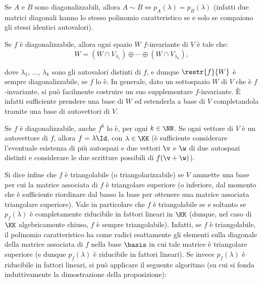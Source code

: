 \documentclass[10pt,landscape]{article}
\begin{document}
\begin{multicols}{3}
		Se $A$ e $B$ sono diagonalizzabili, allora $A \sim B \iff p_A(\lambda) =
		p_B(\lambda)$ (infatti due matrici diagonali hanno lo stesso polinomio
		caratteristico se e solo se compaiono gli stessi identici autovalori).
		
		Se $f$ è diagonalizzabile, allora ogni spazio $W$ $f$-invariante di
		$V$ è tale che:
		\[ W = (W \cap V_{\lambda_1}) \oplus \cdots \oplus (W \cap V_{\lambda_k}), \]
		
		dove $\lambda_1$, ..., $\lambda_k$ sono gli autovalori distinti di
		$f$, e dunque $\restr{f}{W}$ è sempre diagonalizzabile, se $f$ lo è. In generale, dato un sottospazio $W$ di $V$ che
		è $f$-invariante, si può facilmente costruire un suo
		supplementare $f$-invariante. È infatti sufficiente
		prendere una base di $W$ ed estenderla a base di $V$
		completandola tramite una base di autovettori di $V$.
		
		Se $f$ è diagonalizzabile, anche $f^k$ lo è, per ogni $k \in \NN$. Se
		ogni vettore di $V$ è un autovettore di $f$, allora $f = \lambda \Id$,
		con $\lambda \in \KK$ (è sufficiente considerare l'eventuale esistenza di più
		autospazi e due vettori $\v$ e $\w$ di due autospazi distinti e considerare
		le due scritture possibili di $f(\v + \w)$).
		
		Si dice infine che $f$ è triangolabile (o triangolarizzabile) se $V$
		ammette una base per cui la matrice associata di $f$ è triangolare superiore
		(o inferiore, dal momento che è sufficiente riordinare dal basso la base
		per ottenere una matrice associata triangolare superiore). Vale in particolare
		che $f$ è triangolabile se e soltanto se $p_f(\lambda)$ è completamente
		riducibile in fattori lineari in $\KK$ (dunque, nel caso di $\KK$ algebricamente
		chiuso, $f$ è sempre triangolabile). Infatti, se $f$ è triangolabile, il polinomio
		caratteristico ha come radici esattamente gli elementi sulla diagonale della
		matrice associata di $f$ nella base $\basis$ in cui tale matrice è triangolare
		superiore (e dunque $p_f(\lambda)$ è riducibile in fattori lineari). Se invece $p_f(\lambda)$ è riducibile in fattori lineari, si può applicare il seguente
		algoritmo (su cui si fonda induttivamente la dimostrazione della proposizione):
		

\end{multicols}
\end{document}
